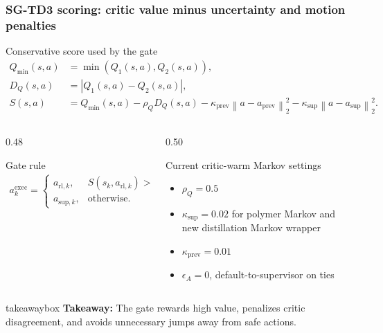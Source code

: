 \documentclass[aspectratio=169]{beamer}
\newcommand{\norm}[1]{\left\lVert #1 \right\rVert}
\newcommand{\takeawaybox}[1]{%
\vspace{0.02cm}
\begin{center}
\begin{beamercolorbox}[wd=0.94\textwidth,sep=3pt,center,rounded=true,shadow=false]{takeawaybox}
\scriptsize
\textbf{\textcolor{maroon1}{Takeaway:}} #1
\end{beamercolorbox}
\end{center}
}
\begin{document}
\begin{frame}
\frametitle{\large \textbf{SG-TD3 scoring: critic value minus uncertainty and motion penalties}}
\scriptsize

\begin{block}{Conservative score used by the gate}
\begin{align*}
Q_{\min}(s,a)&=\min\left(Q_1(s,a),Q_2(s,a)\right),\\
D_Q(s,a)&=|Q_1(s,a)-Q_2(s,a)|,\\
S(s,a)&=Q_{\min}(s,a)
-\rho_QD_Q(s,a)
-\kappa_{\mathrm{prev}}\norm{a-a_{\mathrm{prev}}}_2^2
-\kappa_{\mathrm{sup}}\norm{a-a_{\mathrm{sup}}}_2^2.
\end{align*}
\end{block}

\begin{columns}[T,onlytextwidth]
\begin{column}{0.48\textwidth}
\begin{block}{Gate rule}
\begin{align*}
a_k^{\mathrm{exec}}=
\begin{cases}
a_{\mathrm{rl},k},&
S(s_k,a_{\mathrm{rl},k})>
S(s_k,a_{\mathrm{sup},k})+\epsilon_A,\\
a_{\mathrm{sup},k},&\mathrm{otherwise}.
\end{cases}
\end{align*}
\end{block}
\end{column}

\begin{column}{0.50\textwidth}
\begin{block}{Current critic-warm Markov settings}
\begin{itemize}\justifying
  \setlength\itemsep{0.35ex}
  \item \(\rho_Q=0.5\)
  \item \(\kappa_{\mathrm{sup}}=0.02\) for polymer Markov and new distillation Markov wrapper
  \item \(\kappa_{\mathrm{prev}}=0.01\)
  \item \(\epsilon_A=0\), default-to-supervisor on ties
\end{itemize}
\end{block}
\end{column}
\end{columns}

\takeawaybox{The gate rewards high value, penalizes critic disagreement, and avoids unnecessary jumps away from safe actions.}
\end{frame}
\end{document}
